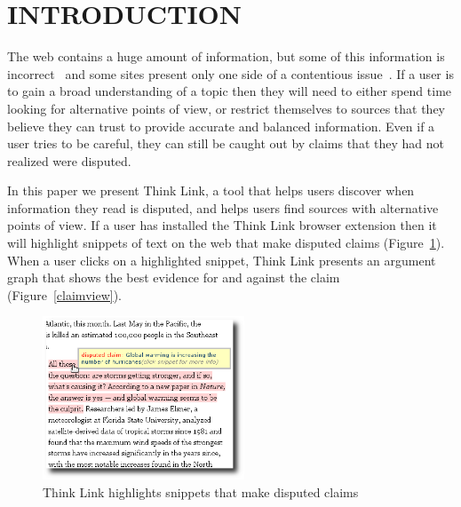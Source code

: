 \documentclass{chi2009}
\newcommand{\todo}[1]{}
\begin{document}




\section{INTRODUCTION}

\todo{update screenshots}

The web contains a huge amount of information, but some of this information is incorrect~\cite{Neumann2003,Resnik1998,Zhou2004} and some sites present only one side of a contentious issue~\cite{Herman2002}. 
If a user is to gain a broad understanding of a topic then they will need to either spend time looking for alternative points of view, or restrict themselves to sources that they believe they can trust to provide accurate and balanced information.
Even if a user tries to be careful, they can still be caught out by claims that they had not realized were disputed.
\todo{word this better}\todo{update all screenshots}

In this paper we present Think Link, a tool that helps users discover when information they read is disputed, and helps users find sources with alternative points of view. 
If a user has installed the Think Link browser extension then it will highlight snippets of text on the web that make disputed claims (Figure~\ref{highlight}). 
When a user clicks on a highlighted snippet, Think Link presents an argument graph that shows the best evidence for and against the claim (Figure~\ref{claimview}). 

\begin{figure}[tb]
	\begin{center}
	\includegraphics[width=6cm]{../screenshots/v2_highlight_shadow.png}
	\caption{Think Link highlights snippets that make disputed claims}
	\label{highlight}
	\end{center}
\end{figure}
\end{document}
